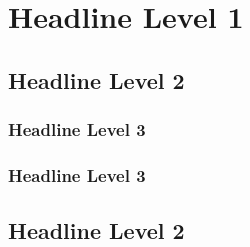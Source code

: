 \section{Headline Level 1}
\lipsum[1]
\subsection{Headline Level 2}
\lipsum[1]
\subsubsection{Headline Level 3}
\lipsum[1]
\subsubsection{Headline Level 3}
\lipsum[1]
\subsection{Headline Level 2}
\lipsum[1]
